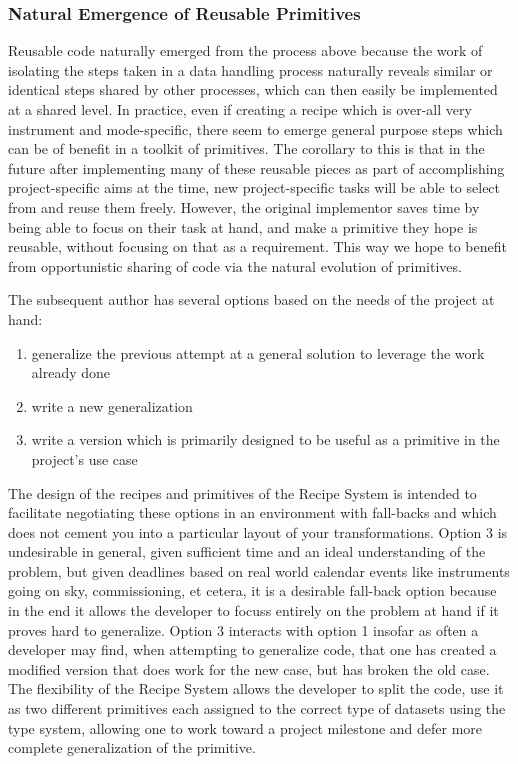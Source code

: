\documentclass[letterpaper,10pt,english]{sphinxmanual}
\begin{document}
\subsubsection{Natural Emergence of Reusable Primitives}
\label{gen.ADMANUAL_ADConcepts:natural-emergence-of-reusable-primitives}
Reusable code naturally emerged from the process above because the
work of isolating the steps taken in a data handling process naturally
reveals similar or identical steps shared by other processes, which
can then easily be implemented at a shared level. In practice, even if
creating a recipe which is over-all very instrument and mode-specific,
there seem to emerge general purpose steps which can be of benefit in
a toolkit of primitives. The corollary to this is that in the future
after implementing many of these reusable pieces as part of
accomplishing project-specific aims at the time, new project-specific
tasks will be able to select from and reuse them freely. However, the
original implementor saves time by being able to focus on their task
at hand, and make a primitive they hope is reusable, without focusing
on that as a requirement. This way we hope to benefit from
opportunistic sharing of code via the natural evolution of primitives.

The subsequent author has several options based on the needs of the
project at hand:
\begin{enumerate}
\item {} 
generalize the previous attempt at a general solution to leverage
the work already done

\item {} 
write a new generalization

\item {} 
write a version which is primarily designed to be useful as a
primitive in the project's use case

\end{enumerate}

The design of the recipes and primitives of the Recipe System is
intended to facilitate negotiating these options in an environment
with fall-backs and which does not cement you into a particular layout
of your transformations. Option 3 is undesirable in general, given
sufficient time and an ideal understanding of the problem, but given
deadlines based on real world calendar events like instruments going
on sky, commissioning, et cetera, it is a desirable fall-back option
because in the end it allows the developer to focuss entirely on the
problem at hand if it proves hard to generalize. Option 3 interacts
with option 1 insofar as often a developer may find, when attempting
to generalize code, that one has created a modified version that does
work for the new case, but has broken the old case. The flexibility of
the Recipe System allows the developer to split the code, use it as
two different primitives each assigned to the correct type of datasets
using the type system, allowing one to work toward a project milestone
and defer more complete generalization of the primitive.
\end{document}

